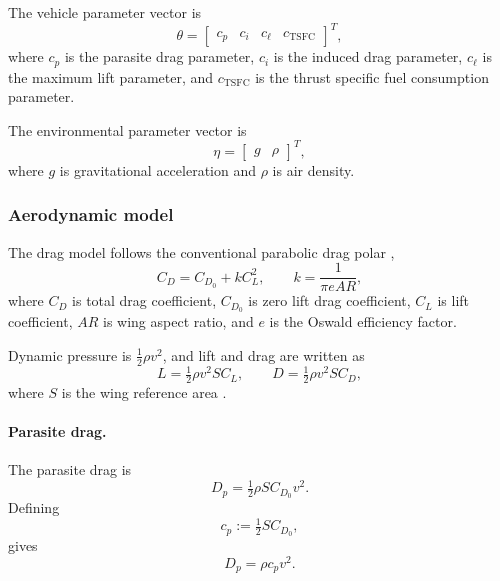 \documentclass[11pt,a4paper]{article}
\newcommand{\vectheta}{\theta}
\newcommand{\veceta}{\eta}
\begin{document}
The vehicle parameter vector is
\begin{equation}
  \vectheta = \begin{bmatrix} c_p & c_i & c_\ell & c_{\mathrm{TSFC}} \end{bmatrix}^{T},
  \label{eq:theta}
\end{equation}
where $c_p$ is the parasite drag parameter, $c_i$ is the induced drag parameter,
$c_\ell$ is the maximum lift parameter, and $c_{\mathrm{TSFC}}$ is the thrust
specific fuel consumption parameter.

The environmental parameter vector is
\begin{equation}
  \veceta = \begin{bmatrix} g & \rho \end{bmatrix}^{T},
\end{equation}
where $g$ is gravitational acceleration and $\rho$ is air density.

\subsubsection{Aerodynamic model}

The drag model follows the conventional parabolic drag polar
\cite{nasa-drag,nasa-induced},
\begin{equation}
  C_D = C_{D_0} + k C_L^2, \qquad k = \frac{1}{\pi e AR},
\end{equation}
where $C_D$ is total drag coefficient, $C_{D_0}$ is zero lift drag coefficient,
$C_L$ is lift coefficient, $AR$ is wing aspect ratio, and $e$ is the Oswald
efficiency factor.

Dynamic pressure is $\tfrac{1}{2}\rho v^2$, and lift and drag are written as
\begin{equation}
  L = \tfrac{1}{2}\rho v^{2} S C_L, \qquad
  D = \tfrac{1}{2}\rho v^{2} S C_D,
  \label{eq:lift-drag}
\end{equation}
where $S$ is the wing reference area \cite{nasa-lift}.

\paragraph{Parasite drag.}
The parasite drag is
\begin{equation}
  D_p = \tfrac{1}{2}\rho S C_{D_0} v^{2} .
\end{equation}
Defining
\begin{equation}
  c_p := \tfrac{1}{2} S C_{D_0},
  \label{eq:cp}
\end{equation}
gives
\begin{equation}
  D_p = \rho c_p v^{2} .
\end{equation}
\end{document}
